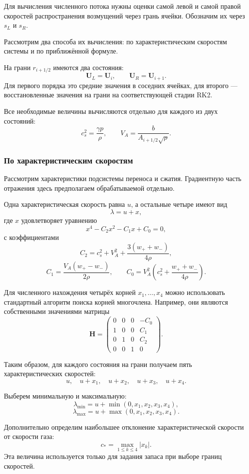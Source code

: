 \documentclass[11pt,a4paper]{article}
\providecommand{\U}{}
\renewcommand{\U}{\bm U}
\begin{document}
Для вычисления численного потока нужны оценки
самой левой и самой правой скоростей распространения
возмущений через грань ячейки.
Обозначим их через $s_L$ и $s_R$.

Рассмотрим два способа их вычисления:
по характеристическим скоростям системы
и по приближённой формуле.

На грани $r_{i+1/2}$ имеются два состояния:
\[
\U_L=\U_i,\qquad \U_R=\U_{i+1}.
\]
Для первого порядка это средние значения в соседних
ячейках, для второго --- восстановленные значения
на грани на соответствующей стадии RK2.

Все необходимые величины вычисляются отдельно
для каждого из двух состояний:
\[
c_s^2=\frac{\gamma p}{\rho},
\qquad
V_A=\frac{b}{A_{i+1/2}\sqrt{\rho}}.
\]

\subsubsection{По характеристическим скоростям}

Рассмотрим характеристики подсистемы переноса
и сжатия. Градиентную часть отражения здесь
предполагаем обрабатываемой отдельно.

Одна характеристическая скорость равна $u$,
а остальные четыре имеют вид
\[
\lambda=u+x,
\]
где $x$ удовлетворяет уравнению
\begin{equation}
x^4-C_2x^2-C_1x+C_0=0,
\label{eq:speed_quartic}
\end{equation}
с коэффициентами
\[
C_2=c_s^2+V_A^2+\frac{3(w_++w_-)}{4\rho},
\]
\[
C_1=\frac{V_A(w_+-w_-)}{2\rho},
\qquad
C_0=V_A^2
\left(c_s^2+\frac{w_++w_-}{4\rho}\right).
\]

Для численного нахождения четырёх корней
$x_1,\ldots,x_4$ можно использовать
стандартный алгоритм поиска корней многочлена.
Например, они являются собственными значениями
матрицы
\[
\bm H=
\begin{pmatrix}
0&0&0&-C_0\\
1&0&0&C_1\\
0&1&0&C_2\\
0&0&1&0
\end{pmatrix}.
\]

Таким образом, для каждого состояния на грани
получаем пять характеристических скоростей:
\[
u,\quad u+x_1,\quad u+x_2,\quad
u+x_3,\quad u+x_4.
\]

Выберем минимальную и максимальную:
\[
\lambda_{\min}
=u+\min(0,x_1,x_2,x_3,x_4),
\]
\[
\lambda_{\max}
=u+\max(0,x_1,x_2,x_3,x_4).
\]

Дополнительно определим наибольшее отклонение
характеристической скорости от скорости газа:
\[
c_*=\max_{1\le k\le4}|x_k|.
\]
Эта величина используется только для задания
запаса при выборе границ скоростей.
\end{document}
